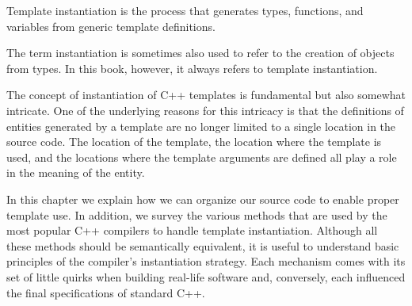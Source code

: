 Template instantiation is the process that generates types, functions, and variables from generic template definitions.

\begin{tcolorbox}[colback=webgreen!5!white,colframe=webgreen!75!black]
\hspace*{0.75cm}The term instantiation is sometimes also used to refer to the creation of objects from types. In this book, however, it always refers to template instantiation.
\end{tcolorbox}

The concept of instantiation of C++ templates is fundamental but also somewhat intricate. One of the underlying reasons for this intricacy is that the definitions of entities generated by a template are no longer limited to a single location in the source code. The location of the template, the location where the template is used, and the locations where the template arguments are defined all play a role in the meaning of the entity.

In this chapter we explain how we can organize our source code to enable proper template use. In addition, we survey the various methods that are used by the most popular C++ compilers to handle template instantiation. Although all these methods should be semantically equivalent, it is useful to understand basic principles of the compiler’s instantiation strategy. Each mechanism comes with its set of little quirks when building real-life software and, conversely, each influenced the final specifications of standard C++.